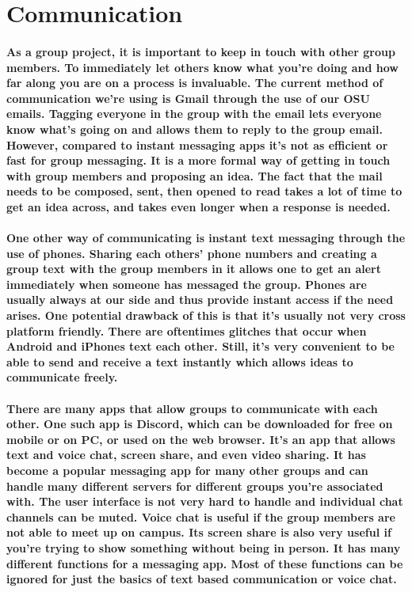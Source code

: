 \documentclass[letterpaper, 10pt, draftclsnofoot, onecolumn, IEEETran]{article}
\begin{document}
\section*{Communication}
\paragraph{As a group project, it is important to keep in touch with other group members. To immediately let others know what you're doing and how far along you are on a process is invaluable. The current method of communication we're using is Gmail through the use of our OSU emails. Tagging everyone in the group with the email lets everyone know what's going on and allows them to reply to the group email. However, compared to instant messaging apps it's not as efficient or fast for group messaging. It is a more formal way of getting in touch with group members and proposing an idea. The fact that the mail needs to be composed, sent, then opened to read takes a lot of time to get an idea across, and takes even longer when a response is needed.}

\paragraph{One other way of communicating is instant text messaging through the use of phones. Sharing each others' phone numbers and creating a group text with the group members in it allows one to get an alert immediately when someone has messaged the group. Phones are usually always at our side and thus provide instant access if the need arises. One potential drawback of this is that it's usually not very cross platform friendly. There are oftentimes glitches that occur when Android and iPhones text each other. Still, it's very convenient to be able to send and receive a text instantly which allows ideas to communicate freely.}

\paragraph{There are many apps that allow groups to communicate with each other. One such app is Discord, which can be downloaded for free on mobile or on PC, or used on the web browser. It's an app that allows text and voice chat, screen share, and even video sharing. It has become a popular messaging app for many other groups and can handle many different servers for different groups you're associated with. The user interface is not very hard to handle and individual chat channels can be muted. Voice chat is useful if the group members are not able to meet up on campus. Its screen share is also very useful if you're trying to show something without being in person. It has many different functions for a messaging app. Most of these functions can be ignored for just the basics of text based communication or voice chat.}
\end{document}
